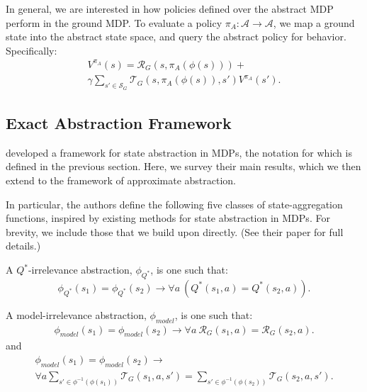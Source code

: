 In general, we are interested in how policies defined over the abstract \ac{MDP} perform in the ground \ac{MDP}. To evaluate a policy $\pi_A:\mathcal{A}\rightarrow\mathcal{A}$, we map a ground state into the abstract state space, and query the abstract policy for behavior. Specifically:
\begin{multline}
V^{\pi_A}(s) = \mathcal{R}_G(s,\pi_A(\phi(s))) + \\
\gamma \sum_{s' \in \mathcal{S}_G} \mathcal{T}_G(s,\pi_A(\phi(s)),s')V^{\pi_A}(s').
\end{multline}


\subsection{Exact Abstraction Framework}

\citeauthor*{li2006towards} developed a framework for state abstraction in \acp{MDP}, the notation for which is defined in the previous section. Here, we survey their main results, which we then extend to the framework of approximate abstraction.

In particular, the authors define the following five classes of state-aggregation functions, inspired by existing methods for state abstraction in \acp{MDP}. For brevity, we include those that we build upon directly. (See their paper for full details.)

\begin{defn}
A $Q^*$-irrelevance abstraction, $\phi_{Q^*}$, is one such that:
\begin{equation}
\phi_{Q^*}(s_1) = \phi_{Q^*}(s_2) \rightarrow \forall a\ \left(Q^*(s_1,a) = Q^*(s_2,a)\right).
\end{equation}
\end{defn}

\begin{defn}
A model-irrelevance abstraction, $\phi_{model}$, is one such that:
\begin{multline}
\phi_{model}(s_1) = \phi_{model}(s_2) \rightarrow \forall a\ \mathcal{R}_G(s_1,a) = \mathcal{R}_G(s_2,a).
\end{multline}
and
\begin{multline}
\phi_{model}(s_1) = \phi_{model}(s_2) \rightarrow \\ \forall a \sum_{s' \in \phi^{-1}(\phi(s_1))} \mathcal{T}_G(s_1,a,s') = \sum_{s' \in \phi^{-1}(\phi(s_2))} \mathcal{T}_G(s_2,a,s').
\end{multline}
\end{defn}

